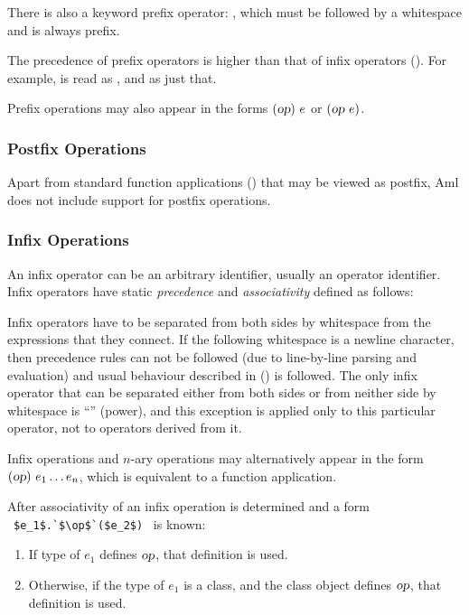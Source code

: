 There is also a keyword prefix operator: , which must be followed by a whitespace and is always prefix.

The precedence of prefix operators is higher than that of infix operators (). For example,  is read as , and  as just that. 

Prefix operations may also appear in the forms $(\mbox{\sl op})\ e$ or $(\mbox{\sl op}\ e)$. 





\subsubsection{Postfix Operations}

Apart from standard function applications () that may be viewed as postfix, Aml does not include support for postfix operations. 





\subsubsection{Infix Operations}
\label{sec:infix-operations}

An infix operator can be an arbitrary identifier, usually an operator identifier. Infix operators have static {\em precedence} and {\em associativity} defined as follows:

Infix operators have to be separated from both sides by whitespace from the expressions that they connect. If the following whitespace is a newline character, then precedence rules can not be followed (due to line-by-line parsing and evaluation) and usual behaviour described in () is followed. The only infix operator that can be separated either from both sides or from neither side by whitespace is ``\code{^}'' (power), and this exception is applied only to this particular operator, not to operators derived from it. 

Infix operations and $n$-ary operations may alternatively appear in the form $(\mbox{\sl op})\ e_1 \ldots e_n$, which is equivalent to a function application. 

After associativity of an infix operation is determined and a form ~\lstinline!$e_1$.`$\op$`($e_2$)!~ is known:
\begin{enumerate}
  \item If type of $e_1$ defines $\mbox{\sl op}$, that definition is used. 
  \item Otherwise, if the type of $e_1$ is a class, and the class object defines $\mbox{\sl op}$, that definition is used. 
\end{enumerate}

